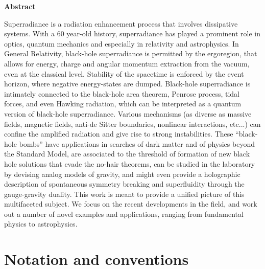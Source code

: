 \documentclass[11pt]{article}
\numberwithin{equation}{section} %
\begin{document}
\begin{titlepage}
\begin{center}
{\bf Abstract}
\end{center}
 \noindent
%
Superradiance is a radiation enhancement process that involves dissipative systems. With a 60 year-old history, superradiance has played a prominent role in optics, quantum mechanics and especially in relativity and astrophysics. 
%
In General Relativity, black-hole superradiance is permitted by the ergoregion, that allows for energy, 
charge and angular momentum extraction from the vacuum, even at the classical level. Stability of the spacetime is 
enforced by the event horizon, where negative energy-states are dumped. Black-hole superradiance is intimately connected 
to the black-hole area theorem, Penrose process, tidal forces, and even Hawking radiation, which can be interpreted as a 
quantum version of black-hole superradiance.
%
Various mechanisms (as diverse as massive fields, magnetic fields, anti-de Sitter boundaries, nonlinear interactions, etc...) can confine the amplified radiation and give rise to strong instabilities. These ``black-hole bombs'' have applications in searches of dark matter and of physics beyond the Standard Model, are associated to the threshold of formation of new black hole solutions that evade the no-hair theorems, can be studied in the laboratory by devising analog models of gravity, and might even provide a holographic description of spontaneous symmetry breaking and superfluidity through the gauge-gravity duality.
%
This work is meant to provide a unified picture of this multifaceted subject. We focus on the recent developments in the field, and work out a number of novel examples and applications, ranging from fundamental physics to astrophysics.


\noindent


\vskip 0.2cm
\noindent

\end{titlepage}

\tableofcontents

\clearpage
\newpage
\section*{Notation and conventions}
\end{document}
